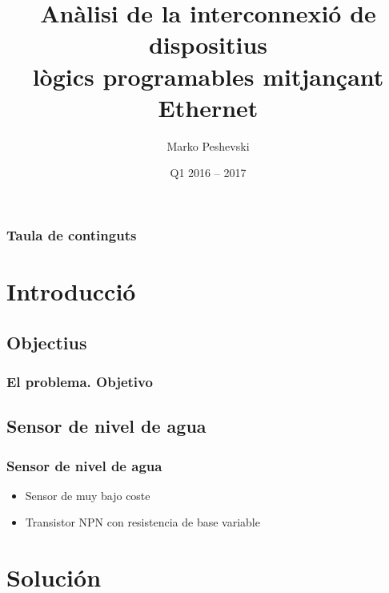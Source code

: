 \documentclass[compress]{beamer}
\title{An\`alisi de la interconnexi\'o de dispositius\\l\`ogics programables mitjan\c cant Ethernet}
\author{Marko Peshevski}
\institute{TFM, MUESAEI}
\date{Q1 2016 -- 2017}
\begin{document}
\begin{frame}[plain]
	\titlepage
\end{frame}

\begin{frame}
    \frametitle{Taula de continguts}
    \tableofcontents
\end{frame}

\setcounter{framenumber}{0}
\section{Introducci\'o}
	\subsection{Objectius}
		\begin{frame}
			\frametitle{El problema. Objetivo}
				\begin{figure}
				\end{figure}
		\end{frame}

	\subsection{Sensor de nivel de agua}
		\begin{frame}
			\frametitle{Sensor de nivel de agua}
				\begin{itemize}
					\item
					{

						Sensor de muy bajo coste

					}
					\item
					{

						Transistor NPN con resistencia de base variable

					}
				\end{itemize}
				\begin{figure}
				\end{figure}
		\end{frame}

\section{Soluci\'on}
\end{document}

